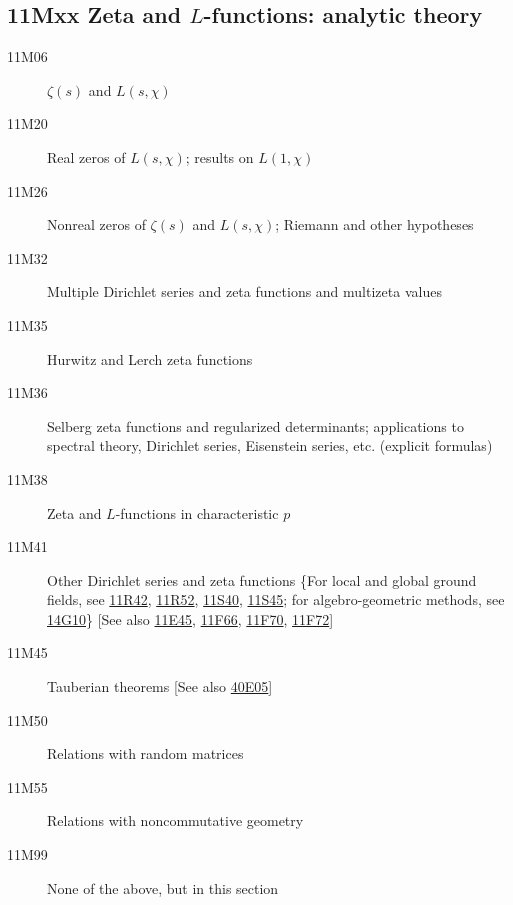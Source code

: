 \documentclass[letterpaper]{article}
\begin{document}
\subsection*{11Mxx  Zeta and $L$-functions: analytic theory }\label{11Mxx}
\begin{description}  
\item [11M06]\label{11M06} $\zeta (s)$ and $L(s, \chi)$
\item [11M20]\label{11M20} Real zeros of $L(s, \chi)$; results on $L(1, \chi)$
\item [11M26]\label{11M26} Nonreal zeros of $\zeta (s)$ and $L(s, \chi)$; Riemann and other hypotheses
\item [11M32]\label{11M32} Multiple Dirichlet series and zeta functions and multizeta values
\item [11M35]\label{11M35} Hurwitz and Lerch zeta functions
\item [11M36]\label{11M36} Selberg zeta functions and regularized determinants; applications to spectral theory, Dirichlet series, Eisenstein series, etc. (explicit formulas)
\item [11M38]\label{11M38} Zeta and $L$-functions in characteristic $p$
\item [11M41]\label{11M41} Other Dirichlet series and zeta functions \{For local and global ground fields, see \hyperref[11R42]{11R42}, \hyperref[11R52]{11R52}, \hyperref[11S40]{11S40}, \hyperref[11S45]{11S45}; for algebro-geometric methods, see \hyperref[14G10]{14G10}\} [See also \hyperref[11E45]{11E45}, \hyperref[11F66]{11F66}, \hyperref[11F70]{11F70}, \hyperref[11F72]{11F72}]
\item [11M45]\label{11M45} Tauberian theorems [See also \hyperref[40E05]{40E05}]
\item [11M50]\label{11M50} Relations with random matrices
\item [11M55]\label{11M55} Relations with noncommutative geometry
\item [11M99]\label{11M99} None of the above, but in this section

\end{description}
\end{document}
